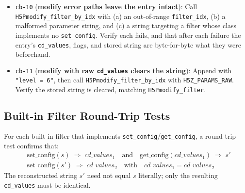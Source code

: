 \documentclass[../RFC-HDFG-2026-001.tex]{subfiles}
\begin{document}
\begin{itemize}
  \texttt{H5Pmodify\_filter\_by\_idx} ().
  Append deflate with \texttt{"level = 6"}, then modify entry~0 with
  \texttt{H5Z\_PARAMS\_STR("level = 9")}.  Verify \texttt{cd\_values[0] == 9},
  that \texttt{H5Pget\_filter\_params\_by\_idx} returns \texttt{"level = 9"}
  verbatim, and that the filter's position and ID are unchanged.  Repeat with
  a three-filter pipeline (shuffle, deflate, fletcher32), modifying the middle
  entry, and verify the order is preserved --- the property that
  remove-and-re-append would destroy.
\item \texttt{cb-10} (\textbf{modify error paths leave the entry intact}):
  Call \texttt{H5Pmodify\_filter\_by\_idx} with (a) an out-of-range
  \texttt{filter\_idx}, (b) a malformed parameter string, and (c) a string
  targeting a filter whose class implements no \texttt{set\_config}.  Verify
  each fails, and that after each failure the entry's \texttt{cd\_values},
  flags, and stored string are byte-for-byte what they were beforehand.
\item \texttt{cb-11} (\textbf{modify with raw \texttt{cd\_values} clears the
  string}): Append with \texttt{"level = 6"}, then call
  \texttt{H5Pmodify\_filter\_by\_idx} with \texttt{H5Z\_PARAMS\_RAW}.  Verify
  the stored string is cleared, matching \texttt{H5Pmodify\_filter}.
\end{itemize}

\subsection{Built-in Filter Round-Trip Tests}
\label{sec:test-builtin-roundtrip}

For each built-in filter that implements \texttt{set\_config}/\texttt{get\_config}, a
round-trip test confirms that:
\begin{align*}
  &\text{set\_config}(s) \;\Rightarrow\; cd\_values_1
  \quad\text{and}\quad
  \text{get\_config}(cd\_values_1) \;\Rightarrow\; s' \\
  &\text{set\_config}(s') \;\Rightarrow\; cd\_values_2
  \quad\text{with}\quad cd\_values_1 = cd\_values_2
\end{align*}
The reconstructed string $s'$ need not equal $s$ literally; only the
resulting \texttt{cd\_values} must be identical.
\end{document}
